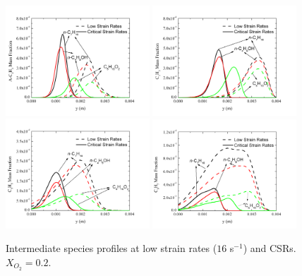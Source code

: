 \documentclass[preprint,3p,times,twocolumn]{elsarticleUS}
\begin{document}
\begin{figure}[h]
  \centering
  \scriptsize
  \includegraphics[trim=4mm 8mm 30mm 20mm, clip=true, width=0.48\textwidth]{A-C3H5-y.png}
  \includegraphics[trim=4mm 8mm 30mm 20mm, clip=true, width=0.48\textwidth]{C3H3-y.png}
  \includegraphics[trim=4mm 8mm 30mm 20mm, clip=true, width=0.48\textwidth]{C5H5-y.png}
  \includegraphics[trim=4mm 8mm 30mm 20mm, clip=true, width=0.48\textwidth]{C9H7-y.png}
  \normalsize
  \vspace{-0.2in}
  \caption{Intermediate species profiles at low strain rates ($16$ s$^{-1}$) and CSRs. $X_{O_2}=0.2$.}
  \label{fig:CxHy}
\end{figure}
\end{document}

